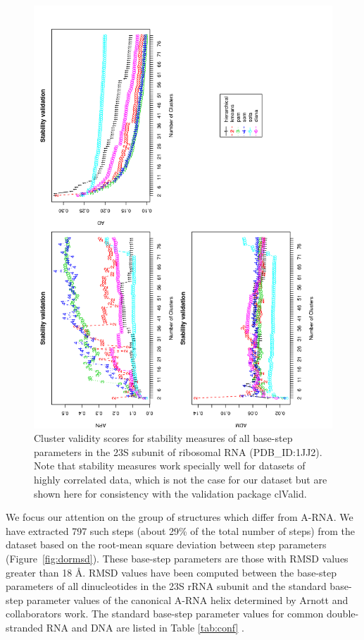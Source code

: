 \begin{figure}
 \centering
\includegraphics[angle=0, scale=0.34]{Chapter2/STval_sta.png}
\caption{Cluster  validity  scores   for  stability  measures  of  all
  base-step   parameters  in   the  23S   subunit  of   ribosomal  RNA
  (PDB\_ID:1JJ2).  Note that stability measures work specially well for
  datasets of  highly correlated data, which  is not the  case for our
  dataset  but are  shown  here for  consistency  with the  validation
  package clValid.}
 \label{fig:stability}
\end{figure}

We focus  our attention on the  group of structures  which differ from
A-RNA.   We have extracted  797 such  steps (about  29\% of  the total
number  of steps)  from  the  dataset based  on  the root-mean  square
deviation  between step  parameters  (Figure~\ref{fig:dormsd}).  These
base-step parameters are  those with RMSD values greater  than 18 \AA.
RMSD values have  been computed between the base-step parameters
of  all  dinucleotides  in  the  23S rRNA  subunit  and  the  standard
base-step parameter values of  the canonical A-RNA helix determined by
Arnott   and  collaborators   \cite{arnott1973}  work.   The  standard
base-step parameter values for  common double-stranded RNA and DNA are
listed in Table \ref{tab:conf} .


